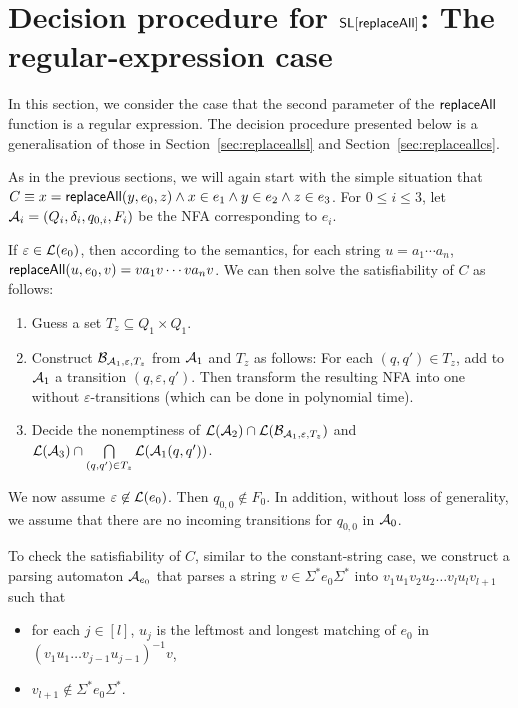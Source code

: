 
\section{Decision procedure for $\mathsf{SL}[\mathsf{replaceAll}]$: The regular-expression case} \label{sec:replaceallre}

In this section, we consider the case that the second parameter of the $\mathsf{replaceAll}$ function is a regular expression.  The decision procedure presented below is a generalisation of those in Section~\ref{sec:replaceallsl} and Section~\ref{sec:replaceallcs}. 

As in the previous sections, we will again start with the simple situation that $C \equiv x = \mathsf{replaceAll}(y, e_0, z) \wedge x \in e_1 \wedge y \in e_2 \wedge z \in e_3$. For $0\leq i\leq 3$, let $\mathcal{A}_i = (Q_i, \delta_i, q_{0,i}, F_i)$ be the NFA corresponding to $e_i$. 

If $\varepsilon \in \mathcal{L}(e_0)$, then according to the semantics, for each string $u = a_1 \cdots a_n$, $\mathsf{replaceAll}(u, e_0, v) = v a_1 v \cdots v a_n v$. We  can then solve the satisfiability of $C$ as follows: 
\begin{enumerate}
\item Guess a set $T_z \subseteq Q_1 \times Q_1$. 
%
\item Construct $\mathcal{B}_{\mathcal{A}_1, \varepsilon, T_z}$ from $\mathcal{A}_1$ and $T_z$ as follows: For each $(q,q') \in T_z$, add to $\mathcal{A}_1$ a transition $(q, \varepsilon, q')$. Then transform the resulting NFA into one without $\varepsilon$-transitions (which can be done in polynomial time).
%
\item  Decide the nonemptiness of $\mathcal{L}(\mathcal{A}_2) \cap \mathcal{L}(\mathcal{B}_{\mathcal{A}_1, \varepsilon, T_z})$ and $\mathcal{L}(\mathcal{A}_3) \cap \bigcap \limits_{(q,q') \in T_z} \mathcal{L}(\mathcal{A}_1(q,q'))$.
\end{enumerate}

We now assume $\varepsilon \not \in \mathcal{L}(e_0)$. Then $q_{0,0} \not \in F_0$. In addition, without loss of generality, we assume that there are no incoming transitions for $q_{0,0}$ in $\mathcal{A}_0$.

To check the satisfiability of $C$, similar to the constant-string case, we construct a parsing automaton $\mathcal{A}_{e_0}$ that parses a string $v \in \Sigma^\ast e_0 \Sigma^\ast$ into $v_1 u_1 v_2 u_2 \dots v_l u_l v_{l+1}$ such that 
\begin{itemize}
	\item for each $j \in [l]$, $u_j$ is the leftmost and longest matching of $e_0$ in $(v_1 u_1 \dots v_{j-1} u_{j-1})^{-1} v$,
	\item $v_{l+1} \not \in \Sigma^\ast e_0 \Sigma^\ast$.
\end{itemize}


